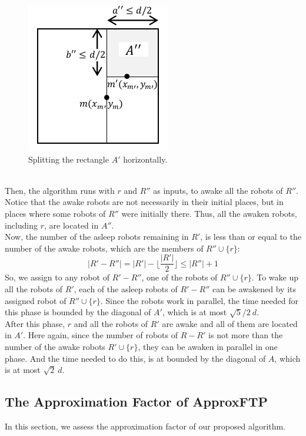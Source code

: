 \documentclass[review]{elsarticle}
\begin{document}
\begin{figure} [h]
  \centering
  \includegraphics[scale=1]{Figs/fig5.pdf}
  \vspace{-15pt}
  \caption{Splitting the rectangle $A'$ horizontally.}
  \label{fig:split A'}
\end{figure}\\
Then, the algorithm runs with $r$ and $R''$ as inputs, to awake all the robots of $R''$. Notice that the awake robots are not necessarily in their initial places, but in places where some robots of $R''$ were initially there. Thus, all the awaken robots, including $r$, are located in $A''$.\\
Now, the number of the asleep robots remaining in $R'$, is less than or equal to the number of the awake robots, which are the members of  ${ R'' \cup \{r\} }$:
$$ |R'-R''|=|R'|-\big\lfloor\dfrac{|R'|}{2}\big\rfloor \leq |R''|+1 $$
So, we assign to any robot of ${ R'-R'' }$, one of the robots of ${ R'' \cup \{r\} }$. To wake up all the robots of $R'$, each of the asleep robots of ${ R'-R'' }$ can be awakened by its assigned robot of ${ R'' \cup \{r\} }$. Since the robots work in parallel, the time needed for this phase is bounded by the diagonal of $A'$, which is at most ${ \sqrt{5}/2~d }$.\\
After this phase, $r$ and all the robots of $R'$ are awake and all of them are located in $A'$. Here again, since the number of robots of ${ R-R' }$ is not more than the number of the awake robots ${ R' \cup \{r\} }$, they can be awaken in parallel in one phase. And the time needed to do this, is at bounded by the diagonal of $A$, which is at most ${\sqrt{2}~d }$.

\subsection{The Approximation Factor of ApproxFTP}
In this section, we assess the approximation factor of our proposed algorithm.
\end{document}
